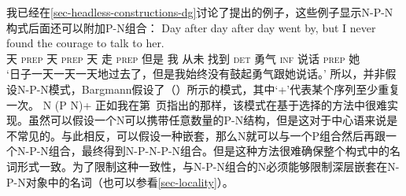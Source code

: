 \begin{exe}
\begin{xlist}[iv.]
\begin{exe}
\begin{xlist}[iv.]
我已经在\ref{sec-headless-constructions-dg}讨论了\citet{Bargmann2015a}提出的例子，这些例子显示N-P-N构式后面还可以附加P-N组合：
\ea
\gll Day after day after day went by, but I never found the courage to talk to her.\\
	 天 \textsc{prep} 天 \textsc{prep} 天 走 \textsc{prep} 但是 我 从未 找到 \textsc{det} 勇气 \textsc{inf} 说话 \textsc{prep} 她\\
\glt `日子一天一天一天地过去了，但是我始终没有鼓起勇气跟她说话。'
\z
所以，并非假设N-P-N模式，Bargmann假设了（）所示的模式，其中`+'\is{$+$}代表某个序列至少重复一次。
\ea
N (P N)+
\z
正如我在第~\pageref{n-p-n-plus-cx}页指出的那样，该模式在基于选择的方法中很难实现。虽然可以假设一个N可以携带任意数量的P-N结构，但是这对于中心语来说是不常见的。与此相反，可以假设一种嵌套，那么N就可以与一个P组合然后再跟一个N-P-N组合，最终得到N-P-N-P-N组合。但是这种方法很难确保整个构式中的名词形式一致。为了限制这种一致性，与N-P-N组合的N必须能够限制深层嵌套在N-P-N对象中的名词（也可以参看\ref{sec-locality}）。


\end{xlist}
\end{exe}
\end{xlist}
\end{exe}

